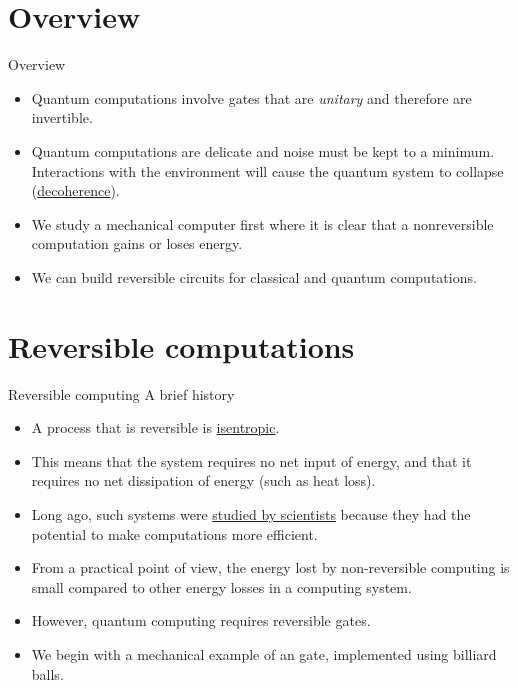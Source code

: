 
\section*{Overview}

\begin{frame}{Overview}
\begin{itemize}
    \item Quantum computations involve gates that are \emph{unitary} and therefore are invertible.
    \item Quantum computations are delicate and noise must be kept to a minimum.  Interactions with the environment will cause the quantum system to collapse (\href{https://en.wikipedia.org/wiki/Quantum_decoherence}{decoherence}).
    \item We study a mechanical computer first where it is clear that a nonreversible computation gains or loses energy.
    \item We can build reversible circuits for classical and quantum computations.
    
\end{itemize}
\end{frame}

\section*{Reversible computations}

\begin{frame}{Reversible computing }{A brief history}
\begin{itemize}[<+->]
    \item A process that is reversible is \href{https://en.wikipedia.org/wiki/Isentropic_process}{isentropic}.
    \item This means that the system requires no net input of energy, and that it requires no net dissipation of energy (such as heat loss).
    \item Long ago, such systems were \href{https://en.wikipedia.org/wiki/Charles_H._Bennett_(physicist)}{studied by scientists} because they had the potential to make computations more efficient.
    \item From a practical point of view, the energy lost by non-reversible computing is small compared to other energy losses in a computing system.
    \item However, quantum computing requires reversible gates.
    \item We begin with a mechanical example of an  gate, implemented using billiard balls.
\end{itemize}
\end{frame}


